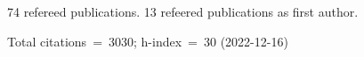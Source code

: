 74 refereed publications. 13 refeered publications as first author.

Total citations~=~3030; h-index~=~30 (2022-12-16)